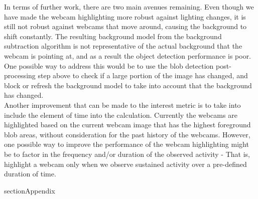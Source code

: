 \documentclass{article}
\begin{document}
In terms of further work, there are two main avenues remaining. Even though we have made the webcam highlighting more robust against lighting changes, it is still not robust against webcams that move around, causing the background to shift constantly. The resulting background model from the background subtraction algorithm is not representative of the actual background that the webcam is pointing at, and as a result the object detection performance is poor. One possible way to address this would be to use the blob detection post-processing step above to check if a large portion of the image has changed, and block or refresh the background model to take into account that the background has changed.\\

Another improvement that can be made to the interest metric is to take into include the element of time into the calculation. Currently the webcams are highlighted based on the current webcam image that has the highest foreground blob areas, without consideration for the past history of the webcams. However, one possible way to improve the performance of the webcam highlighting might be to factor in the frequency and/or duration of the observed activity - That is, highlight a webcam only when we observe sustained activity over a pre-defined duration of time. 

\newpage
section{Appendix}
\end{document}
